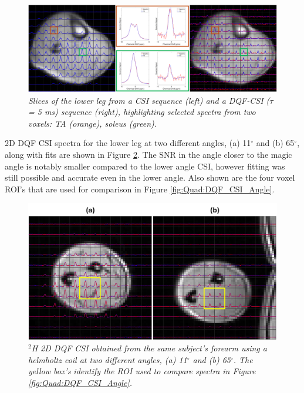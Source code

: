 \documentclass[class=article, crop=false]{standalone}
\begin{document}
\begin{figure}
    \centering
    \includegraphics[width=1\textwidth]{Figures/Quad/SQFDQF_CSI_2.png}
    \caption{\textit{Slices of the lower leg from a CSI sequence (left) and a DQF-CSI ($\tau$ = 5 ms) sequence (right), highlighting selected spectra from two voxels: TA (orange), soleus (green).}}
    \label{fig:Quad:SQFDQF_2}
\end{figure}

2D DQF CSI spectra for the lower leg at two different angles, (a) 11$^\circ$ and (b) 65$^\circ$, along with fits are shown in Figure \ref{fig:Quad:Arm_DQF}. The SNR in the angle closer to the magic angle is notably smaller compared to the lower angle CSI, however fitting was still possible and accurate even in the lower angle. Also shown are the four voxel ROI's that are used for comparison in Figure \ref{fig:Quad:DQF_CSI_Angle}.

\begin{figure}
    \centering
    \includegraphics[width=1\textwidth]{Figures/Quad/Arm_DQF.png}
    \caption{\textit{$^2$H 2D DQF CSI obtained from the same subject's forearm using a helmholtz coil at two different angles, (a) 11$^\circ$ and (b) 65$^\circ$. The yellow box's identify the ROI used to compare spectra in Figure \ref{fig:Quad:DQF_CSI_Angle}.}}
    \label{fig:Quad:Arm_DQF}
\end{figure}
\end{document}
